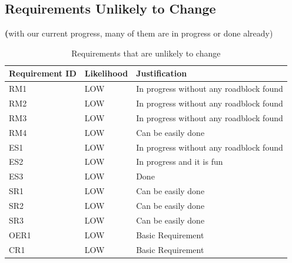 \documentclass[12pt]{article}
\begin{document}
\subsection{Requirements Unlikely to Change}
\noindent\textbf(with our current progress, many of them are in progress or done already)\
\begin{table}[H]
    \begin{tabular}{|p{}|p{}|p{}|}
        \hline Requirement ID & Likelihood & Justification                           \\


        \hline RM1            & LOW        & In progress without any roadblock found \\
        \hline RM2            & LOW        & In progress without any roadblock found \\
        \hline RM3            & LOW        & In progress without any roadblock found \\
        \hline RM4            & LOW        & Can be easily done                      \\
        \hline ES1            & LOW        & In progress without any roadblock found \\
        \hline ES2            & LOW        & In progress and it is fun               \\
        \hline ES3            & LOW        & Done                                    \\
        \hline SR1            & LOW        & Can be easily done                      \\
        \hline SR2            & LOW        & Can be easily done                      \\
        \hline SR3            & LOW        & Can be easily done                      \\
        \hline OER1           & LOW        & Basic Requirement                       \\
        \hline CR1            & LOW        & Basic Requirement                       \\
        \hline
    \end{tabular}
    \caption{Requirements that are unlikely to change}
\end{table}





\end{document}
